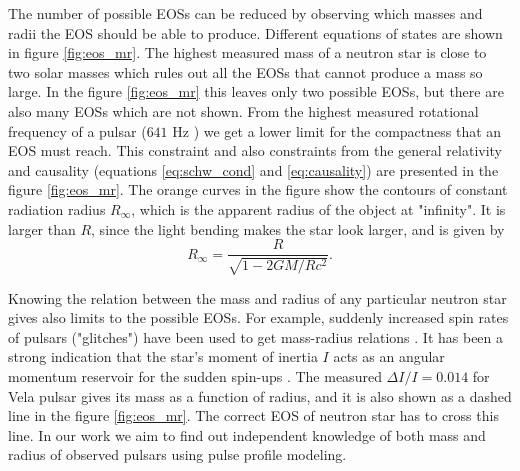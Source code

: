 \documentclass{wihuri}
\def\be{\begin{equation}}
\def\ee{\end{equation}}
\begin{document}
The number of possible EOSs can be reduced by observing which masses and radii the EOS should be able to produce. Different equations of states are shown in figure \ref{fig:eos_mr}. The highest measured mass of a neutron star is close to two solar masses \cite{demorest} which rules out all the EOSs that cannot produce a mass so large. In the figure \ref{fig:eos_mr} this leaves only two possible EOSs, but there are also many EOSs which are not shown. From the highest measured rotational frequency of a pulsar ($641$ Hz \cite{lattimer}) we get a lower limit for the compactness that an EOS must reach. This constraint and also constraints from the general relativity and causality (equations \ref{eq:schw_cond} and \ref{eq:causality}) are presented in the figure \ref{fig:eos_mr}. The orange curves in the figure show the contours of constant radiation radius $R_{\infty}$, which is the apparent radius of the object at "infinity". It is larger than $R$, since the light bending makes the star look larger, and is given by \cite{lattimer2001}
\be \label{eq:rinfty}
R_{\infty} = \frac{R}{\sqrt{1-2GM/Rc^{2}}}.
\ee  

Knowing the relation between the mass and radius of any particular neutron star gives also limits to the possible EOSs. For example, suddenly increased spin rates of pulsars ("glitches") have been used to get mass-radius relations \cite{lattimer2001}. It has been a strong indication that the star's moment of inertia $I$ acts as an angular momentum reservoir for the sudden spin-ups \cite{link1999}. The measured $\Delta I / I = 0.014$  for Vela pulsar gives its mass as a function of radius, and it is also shown as a dashed line in the figure \ref{fig:eos_mr}. The correct EOS of neutron star has to cross this line. In our work we aim to find out independent knowledge %
of both mass and radius of observed pulsars using pulse profile modeling. 




 
\end{document}
